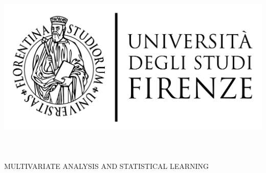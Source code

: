 \begin{titlepage}
	\begin{center}
   	\large
      \hfill
      \vfill
      \begingroup
         \includegraphics[scale=0.15]{logo/LOGO}\\
			\spacedallcaps{\myUni} \\ 
			\myFaculty \\
			\vspace{0.5cm}
			\myDegree \\ 
			\vspace{0.5cm}
         \vspace{0.5cm}    
         MULTIVARIATE ANALYSIS AND STATISTICAL LEARNING    
      \endgroup 
      \vfill 
      \begingroup
      	\color{Maroon}\spacedallcaps{\myItalianTitle} \\ $\ $\\
      	\spacedallcaps{\myEnglishTitle}	
	\bigskip
      \endgroup
      \spacedlowsmallcaps{\myName}
      \vfill 
      \vfill
      \emph{\myProf}
      \vfill
      \vfill
      \myTime
      \vfill                      
	\end{center}        
\end{titlepage}   
